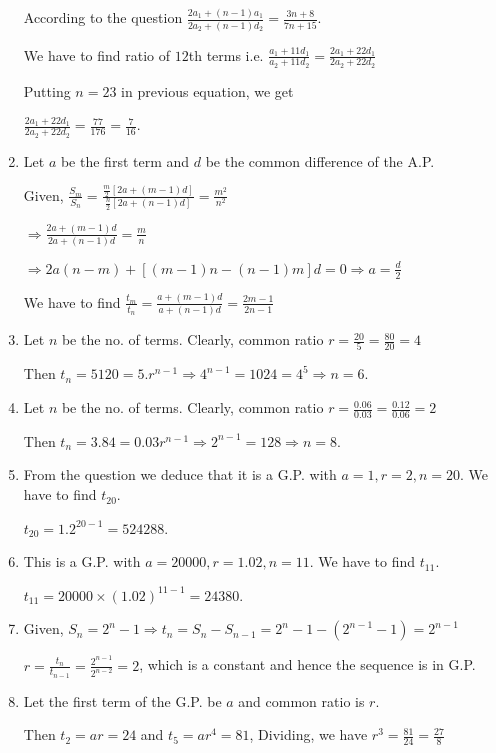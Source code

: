 \begin{enumerate}
  According to the question $\frac{2a_1 + (n - 1)a_1}{2a_2 + (n - 1)d_2} = \frac{3n + 8}{7n + 15}$.

  We have to find ratio of $12$th terms i.e. $\frac{a_1 + 11d_1}{a_2 + 11d_2} = \frac{2a_1 + 22d_1}{2a_2 + 22d_2}$

  Putting $n = 23$ in previous equation, we get

  $\frac{2a_1 + 22d_1}{2a_2 + 22d_2} = \frac{77}{176} = \frac{7}{16}$.
\item Let $a$ be the first term and $d$ be the common difference of the A.P.

  Given, $\frac{S_m}{S_n} = \frac{\tfrac{m}{2}[2a + (m - 1)d]}{\tfrac{n}{2}[2a + (n - 1)d]} = \frac{m^2}{n^2}$

  $\Rightarrow \frac{2a + (m - 1)d}{2a + (n - 1)d} = \frac{m}{n}$

  $\Rightarrow 2a(n - m) + [(m - 1)n - (n - 1)m]d = 0 \Rightarrow a = \frac{d}{2}$

  We have to find $\frac{t_m}{t_n} = \frac{a + (m - 1)d}{a + (n - 1)d} = \frac{2m - 1}{2n - 1}$
\item Let $n$ be the no. of terms. Clearly, common ratio $r = \frac{20}{5} = \frac{80}{20} = 4$

  Then $t_n = 5120 = 5.r^{n - 1} \Rightarrow 4^{n - 1} = 1024 = 4^5 \Rightarrow n = 6$.
\item Let $n$ be the no. of terms. Clearly, common ratio $r = \frac{0.06}{0.03} = \frac{0.12}{0.06} = 2$

  Then $t_n = 3.84 = 0.03r^{n - 1} \Rightarrow 2^{n - 1} = 128 \Rightarrow n = 8$.
\item From the question we deduce that it is a G.P. with $a = 1, r = 2, n = 20$. We have to find $t_{20}$.

  $t_{20} = 1.2^{20 - 1} = 524288$.
\item This is a G.P. with $a = 20000, r = 1.02, n = 11$. We have to find $t_{11}$.

  $t_{11} = 20000\times(1.02)^{11 - 1} = 24380$.
\item Given, $S_n = 2^n - 1 \Rightarrow t_n = S_n - S_{n - 1} = 2^n - 1 - (2^{n - 1} - 1) = 2^{n - 1}$

  $r = \frac{t_n}{t_{n - 1}} = \frac{2^{n - 1}}{2^{n - 2}} = 2$, which is a constant and hence the sequence is in G.P.
\item Let the first term of the G.P. be $a$ and common ratio is $r$.

  Then $t_2 = ar = 24$ and $t_5 = ar^4 = 81$, Dividing, we have $r^3 = \frac{81}{24} = \frac{27}{8}$


\end{enumerate}
